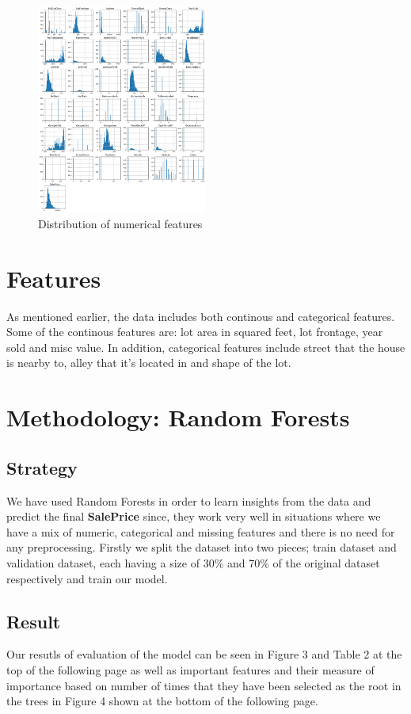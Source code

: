 \documentclass[a4paper,12pt]{article}
\begin{document}
\begin{figure}[] %
    \centering
    \includegraphics[width=0.5\textwidth]{./images/2.png} %
    \caption{Distribution of numerical features}
\end{figure}

\section{Features}
As mentioned earlier, the data includes both continous and categorical features. Some of the continous features are: lot area in squared feet, lot frontage, year sold and misc value. In addition, categorical features include street that the house is nearby to, alley that it's located in and shape of the lot.   

\section{Methodology: Random Forests}
\subsection{Strategy}
We have used Random Forests in order to learn insights from the data and predict the final \textbf{SalePrice} since, they work very well in situations where we have a mix of numeric, categorical and missing features and there is no need for any preprocessing.
Firstly we split the dataset into two pieces; train dataset and validation dataset, each having a size of 30\% and 70\% of the original dataset respectively and train our model.

\subsection{Result}
Our resutls of evaluation of the model can be seen in Figure 3 and Table 2 at the top of the following page as well as important features and their measure of importance based on number of times that they have been selected as the root in the trees in Figure 4 shown at the bottom of the following page.
\end{document}
